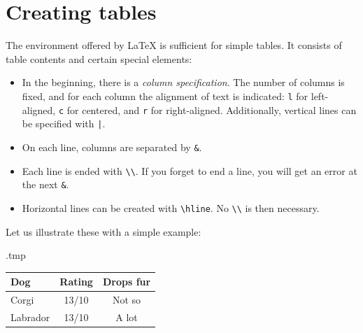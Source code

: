 \section{Creating tables}

The  environment offered by \LaTeX{} is sufficient for simple tables.
It consists of table contents and certain special elements:
\begin{itemize}
\item In the beginning, there is a \emph{column specification}.
    The number of columns is fixed, and for each column the alignment of text is indicated:
    \verb|l| for left-aligned, \verb|c| for centered, and \verb|r| for right-aligned.
    Additionally, vertical lines can be specified with \verb+|+.
\item On each line, columns are separated by \verb|&|.
\item Each line is ended with \verb|\\|.
    If you forget to end a line, you will get an error at the next \verb|&|.
\item Horizontal lines can be created with \verb|\hline|.
    No \verb|\\| is then necessary.
\end{itemize}
%
Let us illustrate these with a simple example:
%
\begin{VerbatimOut}{\jobname.tmp}
\begin{tabular}{l|cc}
Dog & Rating & Drops fur\\
\hline
Corgi & 13/10 & Not so\\
Labrador & 13/10 & A lot
\end{tabular}
\end{VerbatimOut}
\ShowExample




